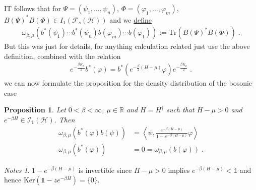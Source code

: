 \documentclass[
a4paper, %
11pt, %
onecolumn, %
openany, %
]{memoir}
\theoremstyle{definition}
\theoremstyle{remark}
\newtheorem{notes}[definition]{Notes}
\theoremstyle{plain}
\newtheorem{prop}[definition]{Proposition}
\begin{document}
IT follows that for $\Psi=(\psi_1,\ldots,\psi_n)$, $\Phi=(\varphi_1,\ldots,\varphi_m)$, $B(\Psi)^*B(\Phi)\in I_1(\mathcal{F}_s(\mathcal{H}))$ and we \underline{define}\begin{align}
\omega_{\beta,\mu}(b^*(\psi_1)\cdots b^*(\psi_n)b(\varphi_m)\cdots b(\varphi_1)):=\mathrm{Tr}(B(\Psi)^*B(\Phi))\;.
\end{align}
But this was just for details, for anything calculation related just use the above definition, combined with the relation\begin{align}
e^{-\frac{\beta K_{\mu}}{2}}b^*(\varphi)=b^*(e^{-\frac{\beta }{2}(H-\mu)}\varphi)e^{-\frac{\beta K_{\mu}}{2}}\; .\label{eqn::boson_relation}
\end{align} we can now formulate the proposition for the density distribution of the bosonic case
\begin{prop} Let $0<\beta<\infty$, $\mu\in\mathbb{R}$ and $H=H^{\dagger}$ such that $H-\mu>0$ and $e^{-\beta H}\in \mathcal{I_1(\mathcal{H})}$. Then \begin{align}
\omega_{\beta,\mu}(b^*(\varphi)b(\psi))&=\left\langle\psi, \frac{e^{-\beta(H-\mu)}}{1-e^{-\beta(H-\mu)}}\varphi\right\rangle\\
\omega_{\beta,\mu}(b^*(\varphi))&=0=\omega_{\beta,\mu}(b(\varphi))\; .
\end{align}
\end{prop}
\begin{notes}
	$1-e^{-\beta(H-\mu)}$ is invertible since $H-\mu>0$ implies $e^{-\beta(H-\mu)}<\mathds{1}$ and hence $\mathrm{Ker}(\mathds{1}-ze^{-\beta H})=\{0\}$.
\end{notes}
\end{document}
